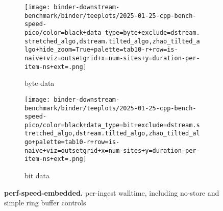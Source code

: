 \begin{figure*}

\begin{subfigure}{0.28\textwidth}
\centering
\texttt{[image: binder-downstream-benchmark/binder/teeplots/2025-01-25-cpp-bench-speed-pico/color=black+data\_type=byte+exclude=dstream.stretched\_algo,dstream.tilted\_algo,zhao\_tilted\_algo+hide\_zoom=True+palette=tab10-r+row=is-naive+viz=outsetgrid+x=num-sites+y=duration-per-item-ns+ext=.png]}
\caption{byte data}
\label{fig:perf-speed-embedded:byte}
\end{subfigure}%
\begin{subfigure}{0.72\textwidth}
\texttt{[image: binder-downstream-benchmark/binder/teeplots/2025-01-25-cpp-bench-speed-pico/color=black+data\_type=bit+exclude=dstream.stretched\_algo,dstream.tilted\_algo,zhao\_tilted\_algo+palette=tab10-r+row=is-naive+viz=outsetgrid+x=num-sites+y=duration-per-item-ns+ext=.png]}
\centering
\caption{bit data}
\label{fig:perf-speed-embedded:bit}
\end{subfigure}

\caption{
\textbf{perf-speed-embedded.}
\footnotesize
per-ingest walltime, including no-store and simple ring buffer controls
}
\label{fig:perf-speed-embedded}
\end{figure*}
